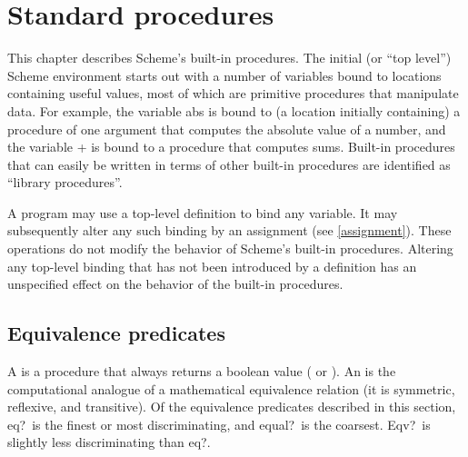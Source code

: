 
\chapter{Standard procedures}
\label{initialenv}
\label{builtinchapter}


This chapter describes Scheme's built-in procedures.  The initial (or
``top level'') Scheme environment starts out with a number of variables
bound to locations containing useful values, most of which are primitive
procedures that manipulate data.  For example, the variable {\cf abs} is
bound to (a location initially containing) a procedure of one argument
that computes the absolute value of a number, and the variable {\cf +}
is bound to a procedure that computes sums.  Built-in procedures that
can easily be written in terms of other built-in procedures are identified as
``library procedures''.

A program may use a top-level definition to bind any variable.  It may
subsequently alter any such binding by an assignment (see \ref{assignment}).
These operations do not modify the behavior of Scheme's built-in
procedures.  Altering any top-level binding that has not been introduced by a
definition has an unspecified effect on the behavior of the built-in procedures.

\section{Equivalence predicates}
\label{equivalencesection}

A  is a procedure that always returns a boolean
value (\schtrue{} or \schfalse).  An  is
the computational analogue of a mathematical equivalence relation (it is
symmetric, reflexive, and transitive).  Of the equivalence predicates
described in this section, {\cf eq?}\ is the finest or most
discriminating, and {\cf equal?}\ is the coarsest.  {\cf Eqv?}\ is
slightly less discriminating than {\cf eq?}.  


